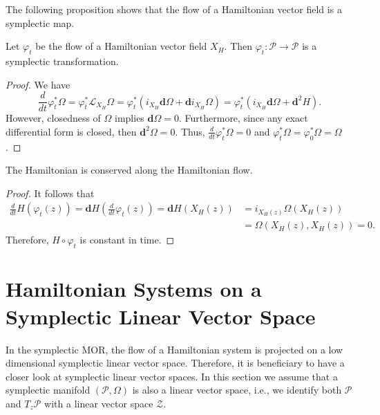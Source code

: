 The following proposition shows that the flow of a Hamiltonian vector field is a symplectic map.
\begin{proposition} \label{theorem:2.9}
Let $\varphi_t$ be the flow of a Hamiltonian vector field $X_H$. Then $\varphi_t:\mathcal P \to \mathcal P$ is a symplectic transformation.
\end{proposition}
\begin{proof}
We have
\begin{equation*}
	\frac{d}{dt} \varphi_t^* \Omega = \varphi_t^* \mathcal L_{X_H} \Omega = \varphi_t^*( i_{X_H} \mathbf d \Omega + \mathbf d i_{X_H} \Omega ) =  \varphi_t^*( i_{X_H} \mathbf d \Omega + \mathbf d^2 H ).
\end{equation*}
However, closedness of $\Omega$ implies $\mathbf d \Omega = 0$. Furthermore, since any exact differential form is closed, then $\mathbf d^2 \Omega = 0$. Thus, $\frac{d}{dt} \varphi_t^* \Omega = 0$ and $\varphi_t^* \Omega = \varphi_0^* \Omega = \Omega$.
\end{proof}
\begin{corollary} \label{theorem:2.10}
The Hamiltonian is conserved along the Hamiltonian flow.
\end{corollary}
\begin{proof}
It follows that
\begin{equation*}
\begin{aligned}
	\frac{d}{dt} H(\varphi_t(z)) = \mathbf dH\left( \frac{d}{dt} \varphi_t(z) \right) = \mathbf dH \left( X_H(z) \right) &= i_{X_H(z)} \Omega(X_H(z))\\
	& = \Omega(X_H(z),X_H(z)) = 0.
\end{aligned}
\end{equation*}
Therefore, $H\circ \varphi_t$ is constant in time.
\end{proof}

\section{Hamiltonian Systems on a Symplectic Linear Vector Space} \label{section:2.4}
In the symplectic MOR, the flow of a Hamiltonian system is projected on a low dimensional symplectic linear vector space. Therefore, it is beneficiary to have a closer look at symplectic linear vector spaces. In this section we assume that a symplectic manifold $(\mathcal P, \Omega)$ is also a linear vector space, i.e., we identify both $\mathcal P$ and $T_z \mathcal P$ with a linear vector space $\mathcal Z$.

